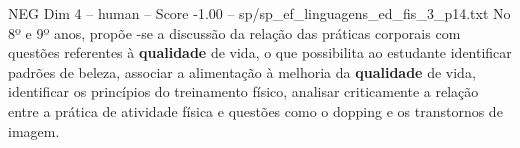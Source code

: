 \begin{textsample}{NEG Dim 4 – human – Score -1.00 – sp/sp\_ef\_linguagens\_ed\_fis\_3\_p14.txt}  \label{ex:f4_neg_017}
No 8º e 9º anos, propõe -se a discussão da relação das práticas corporais com questões referentes à \textbf{qualidade} de vida, o que possibilita ao estudante identificar padrões de beleza, associar a alimentação à melhoria da \textbf{qualidade} de vida, identificar os princípios do treinamento físico, analisar criticamente a relação entre a prática de atividade física e questões como o dopping e os transtornos de imagem.

\end{textsample}
